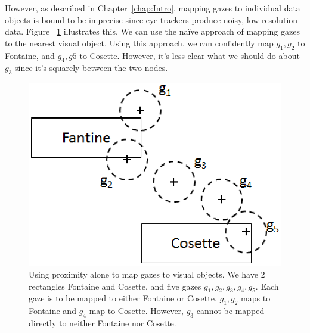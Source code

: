 However, as described in Chapter~\ref{chap:Intro}, mapping gazes to individual data objects is bound to be imprecise since eye-trackers produce noisy, low-resolution data. Figure ~\ref{fig:MiserablesGaze} illustrates this. We can use the na\"{i}ve approach of mapping gazes to the nearest visual object. Using this approach, we can confidently map $g_1, g_2$ to Fontaine, and $g_4, g5$ to Cosette. However, it's less clear what we should do about $g_3$ since it's squarely between the two nodes. 

\begin{figure}[htb]
  \centering
  \includegraphics[width=0.75\linewidth]{images/MiserablesGaze.eps}
  \caption{Using proximity alone to map gazes to visual objects. We have 2 rectangles Fontaine and Cosette, and five gazes $g_1, g_2, g_3, g_4, g_5$. Each gaze is to be mapped to either Fontaine or Cosette. $g_1, g_2$ maps to Fontaine and $g_4$ map to Cosette. However, $g_3$ cannot be mapped directly to neither Fontaine nor Cosette. }
    \label{fig:MiserablesGaze}
\end{figure}